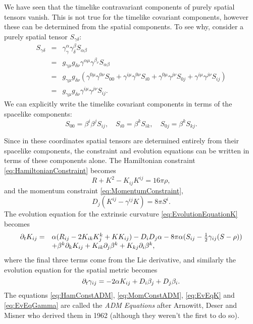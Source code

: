 We have seen that the timelike contravariant components of purely spatial tensors vanish. This is not true for the timelike covariant components, however these can be determined from the spatial components. To see why, consider a purely spatial tensor $S_{\gamma \delta}$:
\begin{equation}
\begin{array}{rcl}
S_{\gamma \delta} &=& \gamma^\alpha_\gamma \gamma^\beta_\delta S_{\alpha \beta} \\
&=& g_{\gamma \mu} g_{\delta \nu} \gamma^{\alpha \mu} \gamma^{\beta_\nu} S_{\alpha \beta} \\
&=& g_{\gamma \mu} g_{\delta \nu} (\gamma^{0\mu}\gamma^{0\nu}S_{00}+\gamma^{i\mu}\gamma^{0\nu}S_{i0}+ \gamma^{0\mu}\gamma^{j\nu}S_{0j}+\gamma^{i\mu}\gamma^{j\nu}S_{ij}) \\
&=& g_{\gamma \mu} g_{\delta \nu}\gamma^{i\mu}\gamma^{j\nu}S_{ij}.
\end{array}
\end{equation}
We can explicitly write the timelike covariant components in terms of the spacelike components:
\begin{equation}
S_{00}=\beta^i \beta^j S_{ij}, \hspace{12pt} S_{i0}=\beta^k S_{ik}, \hspace{12pt} S_{0j}=\beta^k S_{kj}.
\end{equation}

Since in these coordinates spatial tensors are determined entirely from their spacelike components, the constraint and evolution equations can be written in terms of these components alone. The Hamiltonian constraint \ref{eq:HamiltonianConstraint} becomes 
\begin{equation}
\label{eq:HamConstADM}
R+K^2-K_{ij}K^{ij}=16\pi\rho, 
\end{equation}
and the momentum constraint \ref{eq:MomentumConstraint},
\begin{equation}
\label{eq:MomConstADM}
D_j(K^{ij}-\gamma^{ij}K)=8\pi S^i.
\end{equation}
The evolution equation for the extrinsic curvature \ref{eq:EvolutionEquationK} becomes
\begin{equation}
\label{eq:EvEqK}
\begin{array}{rl}
{\partial}_t K_{ij}=&\alpha(R_{ij}-2K_{ik}K^k_j+K K_{ij})-D_i D_j \alpha - 8\pi \alpha(S_{ij} - \frac{1}{2}\gamma_{ij}(S-\rho)) \\
& +\beta^k{\partial}_k K_{ij} + K_{ik}{\partial}_j \beta^k + K_{kj}{\partial}_i \beta^k,
\end{array}
\end{equation}
where the final three terms come from the Lie derivative, and similarly the evolution equation for the spatial metric becomes
\begin{equation}
\label{eq:EvEqGamma}
{\partial}_t \gamma_{ij}=-2\alpha K_{ij}+D_i\beta_j + D_j \beta_i.
\end{equation}
The equations \ref{eq:HamConstADM}, \ref{eq:MomConstADM}, \ref{eq:EvEqK} and \ref{eq:EvEqGamma} are called the \textit{ADM Equations} after Arnowitt, Deser and Misner who derived them in 1962 (although they weren't the first to do so).

